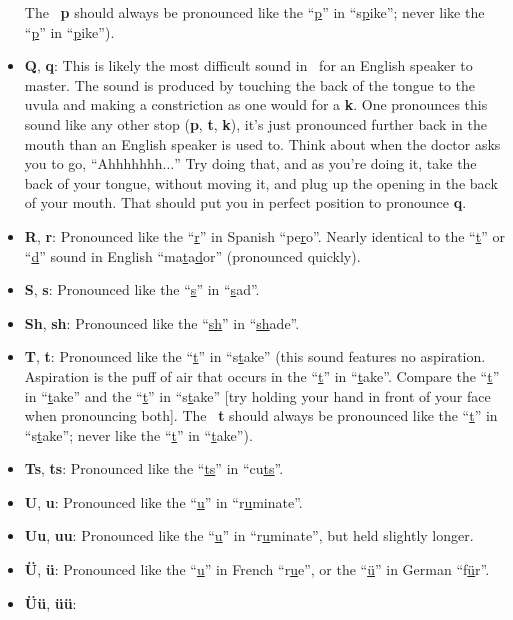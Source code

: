 \begin{itemize}
The \LanguageName\ \textbf{p} should always be pronounced like the ``\uline{p}'' in ``s\uline{p}ike'';
never like the ``\uline{p}'' in ``\uline{p}ike'').
\item
\textbf{Q}, \textbf{q}:
This is likely the most difficult sound in \LanguageName\ for an English speaker to master.
The sound is produced by touching the back of the tongue to the uvula and making a constriction as one would for a \textbf{k}.
One pronounces this sound like any other stop (\textbf{p}, \textbf{t}, \textbf{k}), it's just pronounced further back in the mouth than an English speaker is used to.
Think about when the doctor asks you to go, ``Ahhhhhhh$\ldots$''
Try doing that, and as you're doing it, take the back of your tongue, without moving it, and plug up the opening in the back of your mouth.
That should put you in perfect position to pronounce \textbf{q}.
\item
\textbf{R}, \textbf{r}:
Pronounced like the ``\uline{r}'' in Spanish ``pe\uline{r}o''.
Nearly identical to the ``\uline{t}'' or ``\uline{d}'' sound in English ``ma\uline{t}a\uline{d}or'' (pronounced quickly).
\item
\textbf{S}, \textbf{s}:
Pronounced like the ``\uline{s}'' in ``\uline{s}ad''.
\item
\textbf{Sh}, \textbf{sh}:
Pronounced like the ``\uline{sh}'' in ``\uline{sh}ade''.
\item
\textbf{T}, \textbf{t}:
Pronounced like the ``\uline{t}'' in ``s\uline{t}ake'' (this sound features no aspiration.
Aspiration is the puff of air that occurs in the ``\uline{t}'' in ``\uline{t}ake''.
Compare the ``\uline{t}'' in ``\uline{t}ake'' and the ``\uline{t}'' in ``s\uline{t}ake'' [try holding your hand in front of your face when pronouncing both].
The \LanguageName\ \textbf{t} should always be pronounced like the ``\uline{t}'' in ``s\uline{t}ake'';
never like the ``\uline{t}'' in ``\uline{t}ake'').
\item
\textbf{Ts}, \textbf{ts}:
Pronounced like the ``\uline{ts}'' in ``cu\uline{ts}''.
\item
\textbf{U}, \textbf{u}:
Pronounced like the ``\uline{u}'' in ``r\uline{u}minate''.
\item
\textbf{Uu}, \textbf{uu}:
Pronounced like the ``\uline{u}'' in ``r\uline{u}minate'', but held slightly longer.
\item
\textbf{Ü}, \textbf{ü}:
Pronounced like the ``\uline{u}'' in French ``r\uline{u}e'', or the ``\uline{ü}'' in German ``f\uline{ü}r''.
\item
\textbf{Üü}, \textbf{üü}:

\end{itemize}
